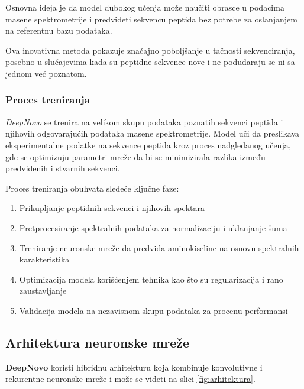 \documentclass[12pt,oneside]{memoir}
\begin{document}
Osnovna ideja je da model dubokog učenja može naučiti obrasce u podacima masene spektrometrije i predvideti sekvencu peptida bez potrebe za oslanjanjem na referentnu bazu podataka.

Ova inovativna metoda pokazuje značajno poboljšanje u tačnosti sekvenciranja, posebno u slučajevima kada su peptidne sekvence nove i ne podudaraju se ni sa jednom već poznatom.

\subsubsection{Proces treniranja}
\emph{DeepNovo} se trenira na velikom skupu podataka poznatih sekvenci peptida i njihovih odgovarajućih podataka masene spektrometrije. Model uči da preslikava eksperimentalne podatke na sekvence peptida kroz proces nadgledanog učenja, gde se optimizuju parametri mreže da bi se minimizirala razlika između predviđenih i stvarnih sekvenci.

Proces treniranja obuhvata sledeće ključne faze:

\begin{enumerate}
\item Prikupljanje peptidnih sekvenci i njihovih spektara

\item Pretprocesiranje spektralnih podataka za normalizaciju i uklanjanje šuma

\item Treniranje neuronske mreže da predviđa aminokiseline na osnovu spektralnih karakteristika

\item Optimizacija modela korišćenjem tehnika kao što su regularizacija i rano zaustavljanje

\item Validacija modela na nezavisnom skupu podataka za procenu performansi
\end{enumerate}

\subsection{Arhitektura neuronske mreže}
\textbf{DeepNovo} koristi hibridnu arhitekturu koja kombinuje konvolutivne i rekurentne neuronske mreže i može se videti na slici \ref{fig:arhitektura}.
\end{document}
